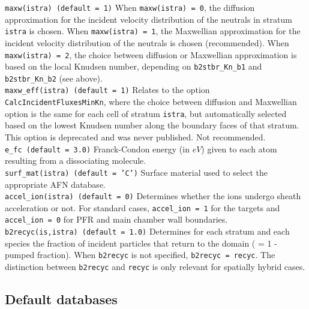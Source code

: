 {\tt maxw(istra) (default = 1)} \newline
When {\tt maxw(istra) = 0}, the diffusion approximation for the incident velocity distribution of the neutrals in stratum {\tt istra} is chosen. When {\tt maxw(istra) = 1}, the Maxwellian approximation for the incident velocity distribution of the neutrals is chosen (recommended). When {\tt maxw(istra) = 2}, the choice between diffusion or Maxwellian approximation is based on the local Knudsen number, depending on {\tt b2stbr\_Kn\_b1} and {\tt b2stbr\_Kn\_b2} (see above). \newline
\\
{\tt maxw\_eff(istra) (default = 1)} \newline
Relates to the option {\tt CalcIncidentFluxesMinKn}, where the choice between diffusion and Maxwellian option is the same for each cell of stratum {\tt istra}, but automatically selected based on the lowest Knudsen number along the boundary faces of that stratum. This option is deprecated and was never published. Not recommended. \newline
\\
{\tt e\_fc (default = 3.0)} \newline
Franck-Condon energy (in $eV$) given to each atom resulting from a dissociating molecule. \newline
\\
{\tt surf\_mat(istra) (default = 'C')}  \newline
Surface material used to select the appropriate AFN database.  \newline
\\
{\tt accel\_ion(istra) (default = 0)} \newline
Determines whether the ions undergo sheath acceleration or not. For standard cases, {\tt accel\_ion = 1} for the targets and {\tt accel\_ion = 0} for PFR and main chamber wall boundaries. \newline
\\
{\tt b2recyc(is,istra) (default = 1.0)} \newline
Determines for each stratum and each species the fraction of incident particles that return to the domain ( = 1 - pumped fraction). When {\tt b2recyc} is not specified, {\tt b2recyc = recyc}. The distinction between {\tt b2recyc} and {\tt recyc} is only relevant for spatially hybrid cases. \newline
\\

\subsection{Default databases}


